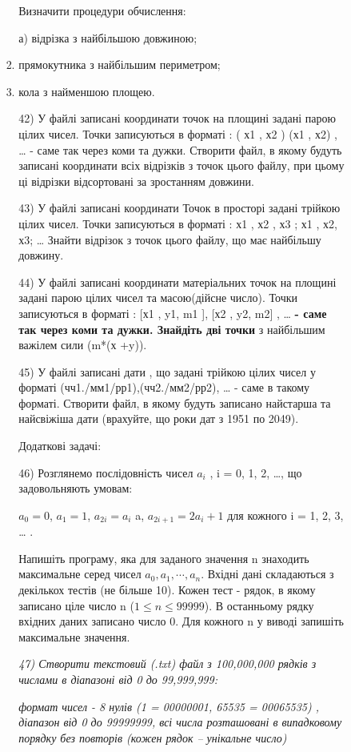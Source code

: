 \documentclass[]{article}
\makeatletter
\newcommand{\xslalph}[1]{\expandafter\@xslalph\csname c@#1\endcsname}
\newcommand{\@xslalph}[1]{%
    \ifcase#1\or а\or б\or в\or г\or д\or e\or є\or ж\or з\or i%
    \or й\or к\or л\or м\or н\or о\or п\or р\or с\or т%
    \or у\or ф\or х\or ц\or ч\or ш\or ю\or я\or аа\or бб\or вв%
    \else\@ctrerr\fi%
}
\makeatother
\begin{document}
\begin{enumerate}
\begin{enumerate}[label=\xslalph*)]
\begin{enumerate}
\begin{enumerate}[label=\xslalph*)]
Визначити процедури обчислення:

а) відрізка з найбільшою довжиною;
\item прямокутника з найбільшим периметром;
\item кола з найменшою площею.

42) У файлі записані координати точок на площині задані парою цілих
чисел. Точки записуються в форматі : ( х1 , х2 ) (х1 , х2) , \ldots{} -
саме так через коми та дужки. Створити файл, в якому будуть записані
координати всіх відрізків з точок цього файлу, при цьому ці відрізки
відсортовані за зростанням довжини.

43) У файлі записані координати Точок в просторі задані трійкою цілих
чисел. Точки записуються в форматі : х1 , х2 , х3 ; х1 , х2, х3;
\ldots{} Знайти відрізок з точок цього файлу, що має найбільшу довжину.

44) У файлі записані координати матеріальних точок на площині задані
парою цілих чисел та масою(дійсне число). Точки записуються в форматі :
{[}х1 , y1, m1 {]}, {[}х2 , y2, m2{]} , \ldots{} \textbf{- саме так
через коми та дужки. Знайдіть дві точки} з найбільшим важілем сили (m*(х
+y)).

45) У файлі записані дати , що задані трійкою цілих чисел у форматі
(чч1./мм1/рр1),(чч2./мм2/рр2), \ldots{} - саме в такому форматі.
Створити файл, в якому будуть записано найстарша та найсвіжіша дати
(врахуйте, що роки дат з 1951 по 2049).

Додаткові задачі:

46) Розглянемо послідовність чисел \(a_{i}\) , i = 0, 1, 2, \ldots{}, що
задовольняють умовам:

\(a_{0} = 0\), \(a_{1} = 1\), \(a_{2i} = a_{i}\) a,
\(a_{2i + 1} = {2a}_{i} + 1\) для кожного i = 1, 2, 3, \ldots{} .

Напишіть програму, яка для заданого значення n знаходить максимальне
серед чисел \(a_{0},a_{1},\cdots,a_{n}\). Вхідні дані складаються з
декількох тестів (не більше 10). Кожен тест - рядок, в якому записано
ціле число n ($1 \le n \le 99 999$). В останньому рядку вхідних даних записано
число 0. Для кожного n у виводі запишіть максимальне значення.

\emph{47) Створити текстовий (.txt) файл з 100,000,000 рядків з числами
в діапазоні від 0 до 99,999,999:}

\emph{формат чисел - 8 нулів (1 = 00000001, 65535 = 00065535) , діапазон
від 0 до 99999999, всі числа розташовані в випадковому порядку без
повторів (кожен рядок -- унікальне число)}


\end{enumerate}
\end{enumerate}
\end{enumerate}
\end{enumerate}
\end{document}
